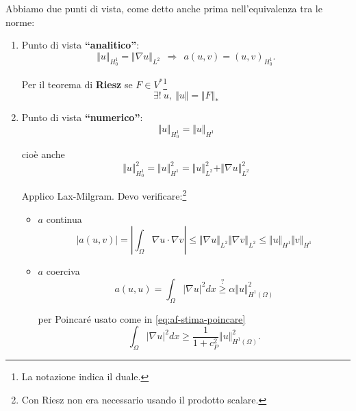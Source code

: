\documentclass[10pt,a4paper,twoside,openright]{book}
\begin{document}
Abbiamo due punti di vista, come detto anche prima nell'equivalenza tra le norme:
\begin{enumerate}
	\item Punto di vista \textbf{``analitico''}: 
	      \begin{equation*}
	      	\boxed{\Vert u\Vert _{H_{0}^{1}} =\Vert \nabla u\Vert _{L^{2}}} \ \ \Rightarrow \ \ a( u,v) =( u,v)_{H_{0}^{1}} .
	      \end{equation*}
	      
	      Per il teorema di \textbf{Riesz }se $\displaystyle F\in V^{*}$\footnote{La notazione indica il duale.}
	      \begin{equation*}
	      	\exists !\ u,\ \Vert u\Vert =\Vert F\Vert _{*}
	      \end{equation*}
	\item Punto di vista \textbf{``numerico''}:
	      \begin{equation*}
	      	\boxed{\Vert u\Vert _{H_{0}^{1}} =\Vert u\Vert _{H^{1}}}
	      \end{equation*}
	      
	      cioè anche
	      \begin{equation*}
	      	\Vert u\Vert _{H_{0}^{1}}^{2} =\Vert u\Vert _{H^{1}}^{2} =\Vert u\Vert _{L^{2}}^{2} +\Vert \nabla u\Vert _{L^{2}}^{2}
	      \end{equation*}
	      
	      Applico Lax-Milgram. Devo verificare:\footnote{Con Riesz non era necessario usando il prodotto scalare.}
	      \begin{itemize}
	      	\item $\displaystyle a$ continua
	      	      \begin{equation*}
	      	      	| a( u,v)| =\left| \int _{\Omega } \nabla u\cdotp \nabla v\right| \leqslant \Vert \nabla u\Vert _{L^{2}}\Vert \nabla v\Vert _{L^{2}} \leqslant \Vert u\Vert _{H^{1}}\Vert v\Vert _{H^{1}}
	      	      \end{equation*}
	      	\item $\displaystyle a$ coerciva
	      	      \begin{equation*}
	      	      	a( u,u) =\int _{\Omega }| \nabla u| ^{2} dx\overset{?}{\geqslant } \alpha \Vert u\Vert _{H^{1}( \Omega )}^{2}
	      	      \end{equation*}
	      	      
	      	      per Poincaré usato come in \eqref{eq:af-stima-poincare}
	      	      \begin{equation*}
	      	      	\int _{\Omega }| \nabla u| ^{2} dx\geqslant \frac{1}{1+c_{P}^{2}}\Vert u\Vert _{H^{1}( \Omega )}^{2} .
	      	      \end{equation*}
	      \end{itemize}
\end{enumerate}
\end{document}
